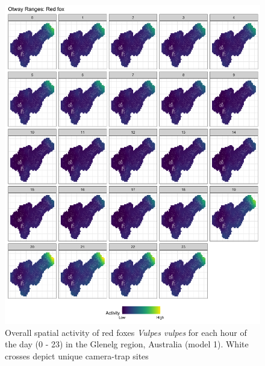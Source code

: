 \documentclass[11pt,a4paper,titlepage,twoside,openright]{style/unimelbthesis}
\begin{document}
\begin{mainmatter}
\begin{figure}
{\centering \includegraphics[width=1\linewidth]{figure/spte_facet_o_fox} 

}

\caption{Overall spatial activity of red foxes \textit{Vulpes vulpes} for each hour of the day (0 - 23) in the Glenelg region, Australia (model 1). White crosses depict unique camera-trap sites}\label{fig:diel-space-g-fox}
\end{figure}
\newpage
\begin{figure}


\end{figure}
\end{mainmatter}
\end{document}
